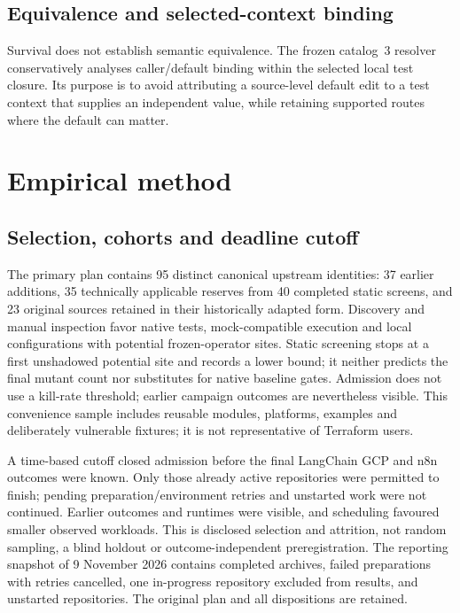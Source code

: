\subsection{Equivalence and selected-context binding}\label{sec:equivalence}
Survival does not establish semantic equivalence. The frozen catalog~3 resolver conservatively analyses caller/default binding within the selected local test closure. Its purpose is to avoid attributing a source-level default edit to a test context that supplies an independent value, while retaining supported routes where the default can matter.


\section{Empirical method}\label{sec:method}
\subsection{Selection, cohorts and deadline cutoff}\label{sec:selection}
The primary plan contains 95 distinct canonical upstream identities: 37 earlier additions, 35 technically applicable reserves from 40 completed static screens, and 23 original sources retained in their historically adapted form. Discovery and manual inspection favor native tests, mock-compatible execution and local configurations with potential frozen-operator sites. Static screening stops at a first unshadowed potential site and records a lower bound; it neither predicts the final mutant count nor substitutes for native baseline gates. Admission does not use a kill-rate threshold; earlier campaign outcomes are nevertheless visible. This convenience sample includes reusable modules, platforms, examples and deliberately vulnerable fixtures; it is not representative of Terraform users.

A time-based cutoff closed admission before the final LangChain GCP and n8n outcomes were known. Only those already active repositories were permitted to finish; pending preparation/environment retries and unstarted work were not continued. Earlier outcomes and runtimes were visible, and scheduling favoured smaller observed workloads. This is disclosed selection and attrition, not random sampling, a blind holdout or outcome-independent preregistration. The reporting snapshot of 9 November 2026 contains \ArchivedRepos{} completed archives, \PreparationFailedRepos{} failed preparations with retries cancelled, one in-progress repository excluded from results, and \UnrunRepos{} unstarted repositories. The original plan and all dispositions are retained.

